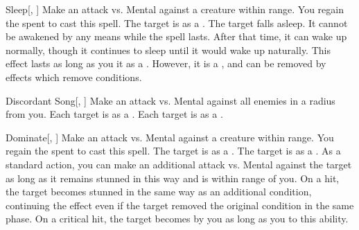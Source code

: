 \lowercase{\hypertarget{spell:Sleep}{}}\label{spell:Sleep}
\begin{apability}[\nth{3}]{\hypertarget{spell:Sleep}{Sleep}}[, ]
Make an attack vs. Mental against a creature within \rngclose range.
\miss You regain the  spent to cast this spell.
\hit The target is \blinded as a .
\crit The target falls asleep.
It cannot be awakened by any means while the spell lasts.
After that time, it can wake up normally, though it continues to sleep until it would wake up naturally.
This effect lasts as long as you  it as a .
However, it is a , and can be removed by effects which remove conditions.
\end{apability}
\vspace{0.25em}



\lowercase{\hypertarget{spell:Discordant Song}{}}\label{spell:Discordant Song}
\begin{apability}[\nth{4}]{\hypertarget{spell:Discordant Song}{Discordant Song}}[, ]
Make an attack vs. Mental against all enemies in a \areamed radius from you.
\hit Each target is \disoriented as a .
\crit Each target is \confused as a .
\end{apability}
\vspace{0.25em}



\lowercase{\hypertarget{spell:Dominate}{}}\label{spell:Dominate}
\begin{apability}[\nth{4}]{\hypertarget{spell:Dominate}{Dominate}}[, ]
Make an attack vs. Mental against a creature within \rngmed range.
\miss You regain the  spent to cast this spell.
\hit The target is  as a .
\crit The target is  as a .
As a standard action, you can make an additional attack vs. Mental against the target as long as it remains stunned in this way and is within \rngmed range of you.
On a hit, the target becomes stunned in the same way as an additional condition, continuing the effect even if the target removed the original condition in the same phase.
On a critical hit, the target becomes  by you as long as you  to this ability.
\end{apability}
\vspace{0.25em}



